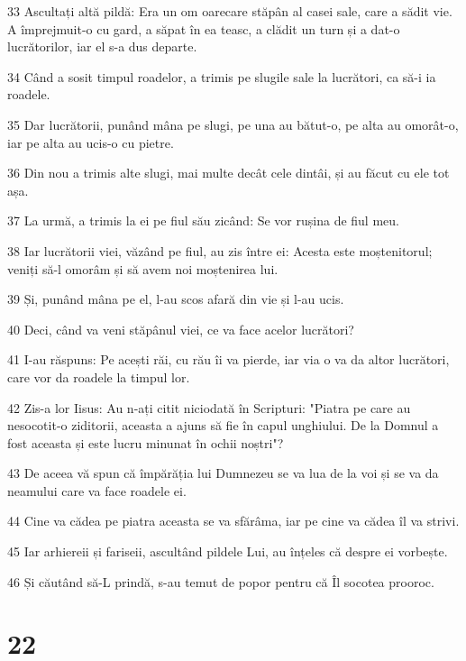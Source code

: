\par 33 Ascultați altă pildă: Era un om oarecare stăpân al casei sale, care a sădit vie. A împrejmuit-o cu gard, a săpat în ea teasc, a clădit un turn și a dat-o lucrătorilor, iar el s-a dus departe.
\par 34 Când a sosit timpul roadelor, a trimis pe slugile sale la lucrători, ca să-i ia roadele.
\par 35 Dar lucrătorii, punând mâna pe slugi, pe una au bătut-o, pe alta au omorât-o, iar pe alta au ucis-o cu pietre.
\par 36 Din nou a trimis alte slugi, mai multe decât cele dintâi, și au făcut cu ele tot așa.
\par 37 La urmă, a trimis la ei pe fiul său zicând: Se vor rușina de fiul meu.
\par 38 Iar lucrătorii viei, văzând pe fiul, au zis între ei: Acesta este moștenitorul; veniți să-l omorâm și să avem noi moștenirea lui.
\par 39 Și, punând mâna pe el, l-au scos afară din vie și l-au ucis.
\par 40 Deci, când va veni stăpânul viei, ce va face acelor lucrători?
\par 41 I-au răspuns: Pe acești răi, cu rău îi va pierde, iar via o va da altor lucrători, care vor da roadele la timpul lor.
\par 42 Zis-a lor Iisus: Au n-ați citit niciodată în Scripturi: "Piatra pe care au nesocotit-o ziditorii, aceasta a ajuns să fie în capul unghiului. De la Domnul a fost aceasta și este lucru minunat în ochii noștri"?
\par 43 De aceea vă spun că împărăția lui Dumnezeu se va lua de la voi și se va da neamului care va face roadele ei.
\par 44 Cine va cădea pe piatra aceasta se va sfărâma, iar pe cine va cădea îl va strivi.
\par 45 Iar arhiereii și fariseii, ascultând pildele Lui, au înțeles că despre ei vorbește.
\par 46 Și căutând să-L prindă, s-au temut de popor pentru că Îl socotea prooroc.

\chapter{22}

